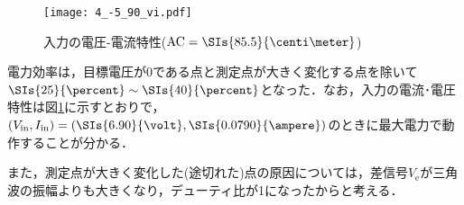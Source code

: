 \documentclass[1_power_supply.tex]{subfiles}
\begin{document}
    \begin{figure}[htbp]
      \begin{center}
        \texttt{[image: 4\_-5\_90\_vi.pdf]}
        \caption{入力の電圧-電流特性($\mathrm{AC}=\SIs{85.5}{\centi\meter}$)}\label{fig:4_v-i}
      \end{center}
    \end{figure}

    電力効率は，目標電圧が0である点と測定点が大きく変化する点を除いて$\SIs{25}{\percent}\sim\SIs{40}{\percent}$となった．なお，入力の電流･電圧特性は図\ref{fig:4_v-i}に示すとおりで，$(V_\mathrm{in},I_\mathrm{in})=(\SIs{6.90}{\volt}, \SIs{0.0790}{\ampere})$のときに最大電力で動作することが分かる．

    また，測定点が大きく変化した(途切れた)点の原因については，差信号$V_\mathrm{e}$が三角波の振幅よりも大きくなり，デューティ比が1になったからと考える．
\end{document}
